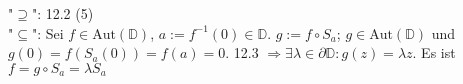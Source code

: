 \documentclass[a4paper,twoside,DIV15,BCOR12mm]{scrbook}
\def\MdD{\mathbb{D}}
\begin{document}
\begin{beweis}
 "$\supseteq$": 12.2 (5)\\
 "$\subseteq$": Sei $f \in \mbox{Aut}(\MdD)$, $a := f^{-1}(0) \in \MdD$. 
 $g := f \circ S_a$; $g \in \mbox{Aut}(\MdD)$ und $g(0) = f(S_a(0)) = f(a) = 0$. 
 12.3 $\Rightarrow \exists \lambda \in \partial \MdD: g(z) = \lambda z$. Es ist $f = g \circ S_a = \lambda S_a$
\end{beweis}


%
%
%
\end{document}

